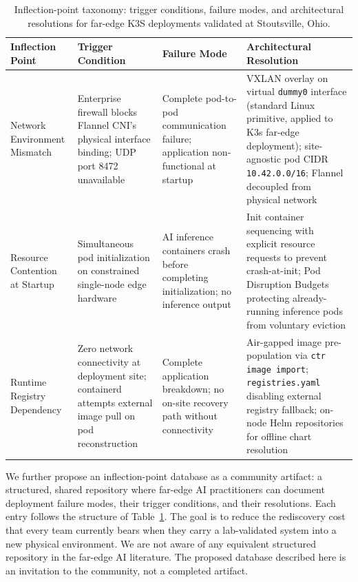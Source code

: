 \begin{table}[htbp]
\centering
\small
\caption{Inflection-point taxonomy: trigger conditions, failure modes, and architectural resolutions for far-edge K3S deployments validated at Stoutsville, Ohio.}
\label{tab:inflection_taxonomy}
\begin{tabularx}{\textwidth}{|X|X|X|X|}
\hline
\textbf{Inflection Point} & \textbf{Trigger Condition} & \textbf{Failure Mode} & \textbf{Architectural Resolution} \\
\hline

Network Environment Mismatch
& Enterprise firewall blocks Flannel CNI's physical interface binding; UDP port 8472 unavailable
& Complete pod-to-pod communication failure; application non-functional at startup
& VXLAN overlay on virtual \texttt{dummy0} interface (standard Linux primitive, applied to K3s far-edge deployment); site-agnostic pod CIDR \texttt{10.42.0.0/16}; Flannel decoupled from physical network \\
\hline

Resource Contention at Startup
& Simultaneous pod initialization on constrained single-node edge hardware
& AI inference containers crash before completing initialization; no inference output
& Init container sequencing with explicit resource requests to prevent crash-at-init; Pod Disruption Budgets protecting already-running inference pods from voluntary eviction \\
\hline

Runtime Registry Dependency
& Zero network connectivity at deployment site; containerd attempts external image pull on pod reconstruction
& Complete application breakdown; no on-site recovery path without connectivity
& Air-gapped image pre-population via \texttt{ctr image import}; \texttt{registries.yaml} disabling external registry fallback; on-node Helm repositories for offline chart resolution \\
\hline

\end{tabularx}
\end{table}

We further propose an inflection-point database as a community artifact: a structured, shared repository where far-edge AI practitioners can document deployment failure modes, their trigger conditions, and their resolutions. Each entry follows the structure of Table~\ref{tab:inflection_taxonomy}. The goal is to reduce the rediscovery cost that every team currently bears when they carry a lab-validated system into a new physical environment. We are not aware of any equivalent structured repository in the far-edge AI literature. The proposed database described here is an invitation to the community, not a completed artifact.

